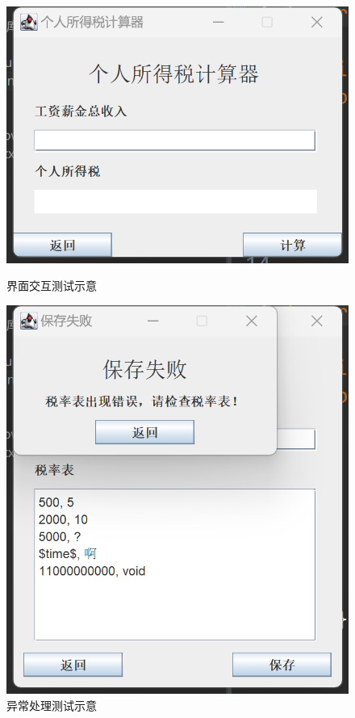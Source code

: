 \documentclass[a4paper, utf8]{ctexart}
\begin{document}
    \begin{figure}[htbp]
        \begin{minipage}{.5\linewidth}
            \centering
            \vspace{0.025\textheight}
            \includegraphics[height=.15\textheight]{./figure/GUItest.png}
            \vspace{0.025\textheight}
            \caption{界面交互测试示意}
        \end{minipage}
        \begin{minipage}{.5\linewidth}
            \centering
            \includegraphics[height=.2\textheight]{./figure/Exceptiontest.png}
            \caption{异常处理测试示意}
        \end{minipage}
    \end{figure}
\end{document}
